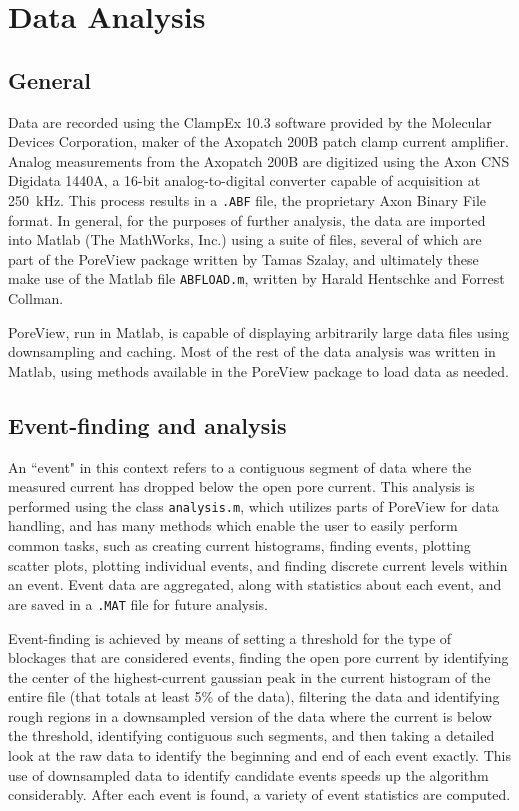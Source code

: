 \chapter{Data Analysis}
\label{data_analysis}

\section{General}

Data are recorded using the ClampEx 10.3 software provided by the Molecular Devices Corporation, maker of the Axopatch 200B patch clamp current amplifier.  Analog measurements from the Axopatch 200B are digitized using the Axon CNS Digidata 1440A, a \num{16}-bit analog-to-digital converter capable of acquisition at \SI{250}{\kHz}.  This process results in a \texttt{.ABF} file, the proprietary Axon Binary File format.  In general, for the purposes of further analysis, the data are imported into Matlab (The MathWorks, Inc.) using a suite of files, several of which are part of the PoreView package written by Tamas Szalay, and ultimately these make use of the Matlab file \texttt{ABFLOAD.m}, written by Harald Hentschke and Forrest Collman.

PoreView, run in Matlab, is capable of displaying arbitrarily large data files using downsampling and caching.  Most of the rest of the data analysis was written in Matlab, using methods available in the PoreView package to load data as needed.


\section{Event-finding and analysis}

An ``event" in this context refers to a contiguous segment of data where the measured current has dropped below the open pore current.  This analysis is performed using the class \texttt{analysis.m}, which utilizes parts of PoreView for data handling, and has many methods which enable the user to easily perform common tasks, such as creating current histograms, finding events, plotting scatter plots, plotting individual events, and finding discrete current levels within an event.  Event data are aggregated, along with statistics about each event, and are saved in a \texttt{.MAT} file for future analysis.

Event-finding is achieved by means of setting a threshold for the type of blockages that are considered events, finding the open pore current by identifying the center of the highest-current gaussian peak in the current histogram of the entire file (that totals at least \num{5}\% of the data), filtering the data and identifying rough regions in a downsampled version of the data where the current is below the threshold, identifying contiguous such segments, and then taking a detailed look at the raw data to identify the beginning and end of each event exactly.  This use of downsampled data to identify candidate events speeds up the algorithm considerably.  After each event is found, a variety of event statistics are computed.


